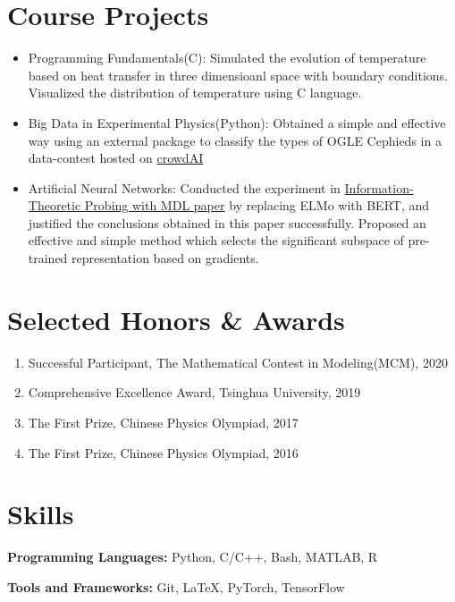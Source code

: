 \documentclass{resume}
\begin{document}
\section{Course Projects}
\begin{itemize}
    \item Programming Fundamentals(C): Simulated the evolution of temperature based on heat transfer in three dimensioanl space with boundary conditions. Visualized the distribution of temperature using C language.
    \item Big Data in Experimental Physics(Python): Obtained a simple and effective way using an external package to classify the types of OGLE Cephieds in a data-contest hosted on \href{https://data-contest.applysquare.com/challenges/pd2020}{crowdAI}
    \item Artificial Neural Networks: Conducted the experiment in \href{https://lena-voita.github.io/posts/mdl_probes.html}{Information-Theoretic Probing with MDL paper} by replacing ELMo with BERT, and justified the conclusions obtained in this paper successfully. Proposed an effective and simple method which selects the significant subspace of pre-trained representation based on gradients.
\end{itemize}




\section{Selected Honors \& Awards}
\begin{enumerate}
    \item Successful Participant, The Mathematical Contest in Modeling(MCM), 2020
    \item Comprehensive Excellence Award, Tsinghua University, 2019
    \item The First Prize, Chinese Physics Olympiad, 2017
    \item The First Prize, Chinese Physics Olympiad, 2016
\end{enumerate}

\section{Skills}
\textbf{Programming Languages:} \small Python, C/C++, Bash, MATLAB, R

\textbf{Tools and Frameworks:} \small Git, \LaTeX, PyTorch, TensorFlow
\end{document}
